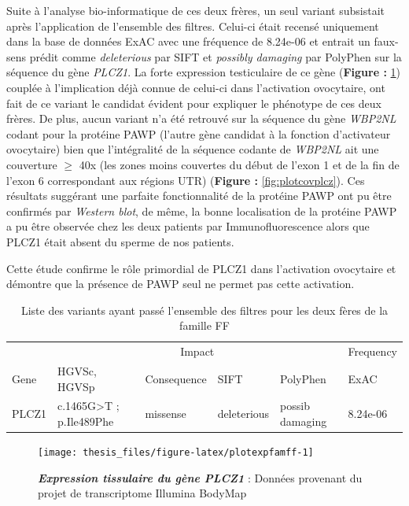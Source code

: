 \documentclass[12pt,a4paper,twoside]{ugathesis}
\theoremstyle{definition}
\theoremstyle{definition}
\theoremstyle{definition}
\theoremstyle{remark}
\begin{document}
Suite à l'analyse bio-informatique de ces deux frères, un seul variant
subsistait après l'application de l'ensemble des filtres. Celui-ci était
recensé uniquement dans la base de données ExAC avec une fréquence de
8.24e-06 et entrait un faux-sens prédit comme \emph{deleterious} par
SIFT et \emph{possibly damaging} par PolyPhen sur la séquence du gène
\emph{PLCZ1}. La forte expression testiculaire de ce gène
(\textbf{Figure : }\ref{fig:plotexpfamff}) couplée à l'implication déjà
connue de celui-ci dans l'activation ovocytaire, ont fait de ce variant
le candidat évident pour expliquer le phénotype de ces deux frères. De
plus, aucun variant n'a été retrouvé sur la séquence du gène
\emph{WBP2NL} codant pour la protéine PAWP (l'autre gène candidat à la
fonction d'activateur ovocytaire) bien que l'intégralité de la séquence
codante de \emph{WBP2NL} ait une couverture \(\ge\) 40x (les zones moins
couvertes du début de l'exon 1 et de la fin de l'exon 6 correspondant
aux régions UTR) (\textbf{Figure : }\ref{fig:plotcovplcz}). Ces
résultats suggérant une parfaite fonctionnalité de la protéine PAWP ont
pu être confirmés par \emph{Western blot}, de même, la bonne
localisation de la protéine PAWP a pu être observée chez les deux
patients par Immunofluorescence alors que PLCZ1 était absent du sperme
de nos patients.

Cette étude confirme le rôle primordial de PLCZ1 dans l'activation
ovocytaire et démontre que la présence de PAWP seul ne permet pas cette
activation.

\begin{longtable}[t]{llllll}
\caption{\label{tab:tabrecapff}Liste des variants ayant passé l'ensemble des filtres pour les deux fères de la famille FF}\\
\toprule
\multicolumn{1}{c}{ } & \multicolumn{4}{c}{Impact} & \multicolumn{1}{c}{Frequency} \\
\cmidrule(l{2pt}r{2pt}){2-5} \cmidrule(l{2pt}r{2pt}){6-6}
Gene & HGVSc, HGVSp & Consequence & SIFT & PolyPhen & ExAC\\
\midrule
PLCZ1 & c.1465G>T ; p.Ile489Phe & missense & deleterious & possib damaging & 8.24e-06\\
\bottomrule
\end{longtable}

\newpage

\begin{figure}

{\centering \texttt{[image: thesis\_files/figure-latex/plotexpfamff-1]} 

}

\caption[Expression tissulaire du gène \emph{PLCZ1}]{\textbf{\emph{Expression tissulaire du gène
\emph{PLCZ1}}} : Données provenant du projet de transcriptome Illumina
BodyMap}\label{fig:plotexpfamff}
\end{figure}
\end{document}
